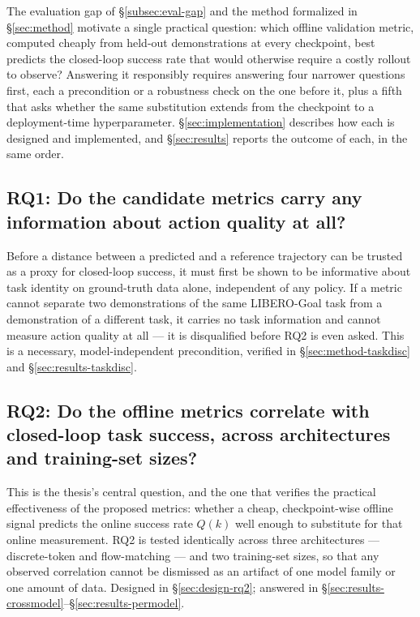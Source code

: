 \documentclass[english,12pt,a4paper,pdftex,elec,utf8]{aaltothesis}
\begin{document}
The evaluation gap of \S\ref{subsec:eval-gap} and the method formalized in \S\ref{sec:method} motivate a single practical question: which offline validation metric, computed cheaply from held-out demonstrations at every checkpoint, best predicts the closed-loop success rate that would otherwise require a costly rollout to observe? Answering it responsibly requires answering four narrower questions first, each a precondition or a robustness check on the one before it, plus a fifth that asks whether the same substitution extends from the checkpoint to a deployment-time hyperparameter. \S\ref{sec:implementation} describes how each is designed and implemented, and \S\ref{sec:results} reports the outcome of each, in the same order.

\subsection{RQ1: Do the candidate metrics carry any information about action quality at all?}
\label{sec:rq1}

Before a distance between a predicted and a reference trajectory can be trusted as a proxy for closed-loop success, it must first be shown to be informative about task identity on ground-truth data alone, independent of any policy. If a metric cannot separate two demonstrations of the same LIBERO-Goal task from a demonstration of a different task, it carries no task information and cannot measure action quality at all --- it is disqualified before RQ2 is even asked. This is a necessary, model-independent precondition, verified in \S\ref{sec:method-taskdisc} and \S\ref{sec:results-taskdisc}.

\subsection{RQ2: Do the offline metrics correlate with closed-loop task success, across architectures and training-set sizes?}
\label{sec:rq2}

This is the thesis's central question, and the one that verifies the practical effectiveness of the proposed metrics: whether a cheap, checkpoint-wise offline signal predicts the online success rate $Q(k)$ well enough to substitute for that online measurement. RQ2 is tested identically across three architectures --- discrete-token and flow-matching --- and two training-set sizes, so that any observed correlation cannot be dismissed as an artifact of one model family or one amount of data. Designed in \S\ref{sec:design-rq2}; answered in \S\ref{sec:results-crossmodel}--\S\ref{sec:results-permodel}.
\end{document}
